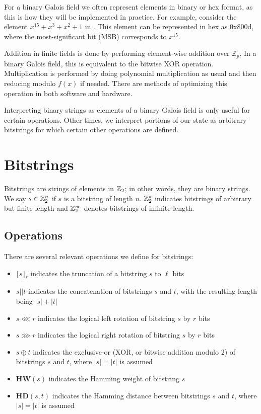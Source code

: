 For a binary Galois field we often represent elements in binary or hex format, as this is how they will be implemented in practice.
For example, consider the element $x^{15} + x^3 + x^2 + 1$ in \gfsixteen.
This element can be represented in hex as $\mathrm{0x800d}$, where the most-significant bit (MSB) corresponds to $x^{15}$. 

Addition in finite fields is done by performing element-wise addition over $\mathbb{Z}_p$.
In a binary Galois field, this is equivalent to the bitwise XOR operation.
Multiplication is performed by doing polynomial multiplication as usual and then reducing modulo $f(x)$ if needed.
There are methods of optimizing this operation in both software and hardware.

Interpreting binary strings as elements of a binary Galois field is only useful for certain operations. Other times, we interpret portions of our state as arbitrary bitstrings for which certain other operations are defined.
 
\section{Bitstrings}
Bitstrings are strings of elements in $\mathbb{Z}_2$; in other words, they are binary strings.
We say $s \in \mathbb{Z}_2^n$ if $s$ is a bitstring of length $n$.
$\mathbb{Z}_2^*$ indicates bitstrings of arbitrary but finite length and $\mathbb{Z}_2^{\infty}$ denotes bitstrings of infinite length.

\subsection{Operations}
There are several relevant operations we define for bitstrings:
\begin{itemize}
\item $\lfloor s \rfloor_{\ell}$ indicates the truncation of a bitstring $s$ to $\ell$ bits
\item $s||t$ indicates the concatenation of bitstrings $s$ and $t$, with the resulting length being $|s| + |t|$
\item $s \lll r$ indicates the logical left rotation of bitstring $s$ by $r$ bits 
\item $s \ggg r$ indicates the logical right rotation of bitstring $s$ by $r$ bits 
\item $s \oplus t$ indicates the exclusive-or (XOR, or bitwise addition modulo $2$) of bitstrings $s$ and $t$, where $|s| = |t|$ is assumed
\item $\mathbf{HW}(s)$ indicates the Hamming weight of bitstring $s$
\item $\mathbf{HD}(s,t)$ indicates the Hamming distance between bitstrings $s$ and $t$, where $|s| = |t|$ is assumed
\end{itemize}

